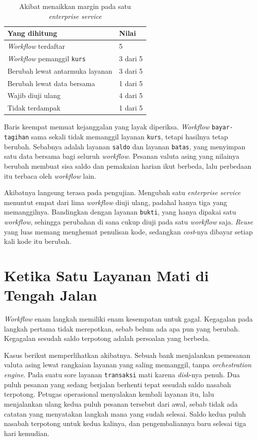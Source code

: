 \begin{table}[htbp]
  \centering
  \caption{Akibat menaikkan margin pada satu \textit{enterprise service}}
  \label{tab:dampak-kurs}
  \begin{tabularx}{\textwidth}{|X|l|}
    \hline
    \textbf{Yang dihitung} & \textbf{Nilai} \\
    \hline
    \textit{Workflow} terdaftar & 5 \\
    \hline
    \textit{Workflow} pemanggil \texttt{kurs} & 3 dari 5 \\
    \hline
    Berubah lewat antarmuka layanan & 3 dari 5 \\
    \hline
    Berubah lewat data bersama & 1 dari 5 \\
    \hline
    Wajib diuji ulang & 4 dari 5 \\
    \hline
    Tidak terdampak & 1 dari 5 \\
    \hline
  \end{tabularx}
\end{table}

Baris keempat memuat kejanggalan yang layak diperiksa. \textit{Workflow}
\texttt{bayar-tagihan} sama sekali tidak memanggil layanan \texttt{kurs},
tetapi hasilnya tetap berubah. Sebabnya adalah layanan \texttt{saldo} dan
layanan \texttt{batas}, yang menyimpan satu data bersama bagi seluruh
\textit{workflow}. Pesanan valuta asing yang nilainya berubah membuat sisa saldo
dan pemakaian harian ikut berbeda, lalu perbedaan itu terbaca oleh
\textit{workflow} lain.

Akibatnya langsung terasa pada pengujian. Mengubah satu \textit{enterprise
service} menuntut empat dari lima \textit{workflow} diuji ulang, padahal hanya tiga yang
memanggilnya. Bandingkan dengan layanan \texttt{bukti}, yang hanya dipakai satu
\textit{workflow}, sehingga perubahan di sana cukup diuji pada satu \textit{workflow} saja.
\textit{Reuse} yang luas memang menghemat penulisan kode, sedangkan \textit{cost}-nya
dibayar setiap kali kode itu berubah.

\section{Ketika Satu Layanan Mati di Tengah Jalan}

\textit{Workflow} enam langkah memiliki enam kesempatan untuk gagal. Kegagalan pada
langkah pertama tidak merepotkan, sebab belum ada apa pun yang berubah.
Kegagalan sesudah saldo terpotong adalah persoalan yang berbeda.

Kasus berikut memperlihatkan akibatnya. Sebuah bank menjalankan pemesanan
valuta asing lewat rangkaian layanan yang saling memanggil, tanpa
\textit{orchestration engine}. Pada suatu sore layanan \texttt{transaksi} mati
karena \textit{disk}-nya penuh. Dua puluh pesanan yang sedang berjalan berhenti
tepat sesudah saldo nasabah terpotong. Petugas operasional menyalakan kembali
layanan itu, lalu menjalankan ulang kedua puluh pesanan tersebut dari awal,
sebab tidak ada catatan yang menyatakan langkah mana yang sudah selesai. Saldo
kedua puluh nasabah terpotong untuk kedua kalinya, dan pengembaliannya baru
selesai tiga hari kemudian.

